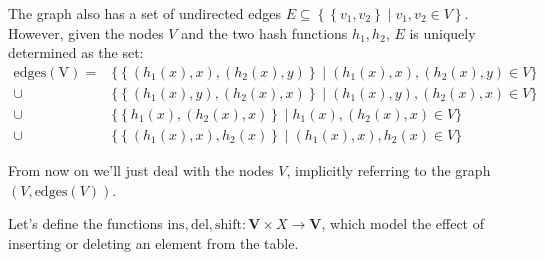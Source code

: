 \documentclass[a4paper, 12pt]{article}
\begin{document}
The graph also has a set of undirected edges \(E \subseteq \left\{ \left\{ v_1, v_2 \right\} \mid v_1,v_2 \in V \right\}\). However, given the nodes \(V\) and the two hash functions \(h_1,h_2\), \(E\) is uniquely determined as the set:
\begin{align*}
  \mathrm{edges(V)} =
  &\{ \left\{ (h_1(x), x), (h_2(x), y) \right\} \mid (h_1(x), x), (h_2(x), y) \in V \} \\
  \cup& \{ \left\{ (h_1(x), y), (h_2(x), x) \right\} \mid (h_1(x), y), (h_2(x), x) \in V \} \\
  \cup& \{ \left\{ h_1(x), (h_2(x), x) \right\} \mid h_1(x), (h_2(x), x) \in V \} \\
  \cup& \{ \left\{ (h_1(x), x), h_2(x) \right\} \mid (h_1(x), x), h_2(x) \in V \}
\end{align*}

From now on we'll just deal with the nodes \(V\), implicitly referring to the graph \((V, \mathrm{edges}(V))\).

Let's define the functions \(\mathrm{ins}, \mathrm{del}, \mathrm{shift} : \mathbf{V} \times X \to \mathbf{V}\), which model the effect of inserting or deleting an element from the table.
\end{document}

